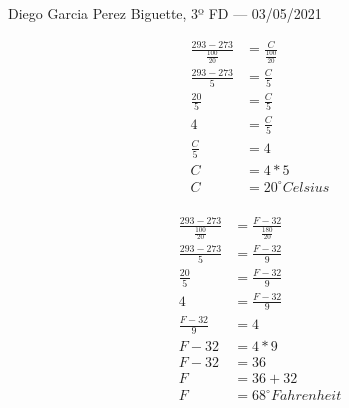 \documentclass{SchoolBook}
\begin{document}
\begin{day}{Diego Garcia Perez Biguette, 3º FD --- 03/05/2021}
\begin{enumerate}
            \begin{multicols}{2}
                \begin{align*}
                    \frac{293-273}{\frac{100}{20}} &= \frac{C}{\frac{100}{20}} \\
                                 \frac{293-273}{5} &= \frac{C}{5} \\
                                      \frac{20}{5} &= \frac{C}{5} \\
                                                 4 &= \frac{C}{5} \\
                                       \frac{C}{5} &= 4 \\
                                                 C &= 4 * 5 \\
                                                 C &= 20^\circ Celsius
                \end{align*} \\
                \begin{align*}
                    \frac{293-273}{\frac{100}{20}} &= \frac{F-32}{\frac{180}{20}} \\
                                 \frac{293-273}{5} &= \frac{F-32}{9} \\
                                      \frac{20}{5} &= \frac{F-32}{9} \\
                                                 4 &= \frac{F-32}{9} \\
                                    \frac{F-32}{9} &= 4 \\
                                              F-32 &= 4 * 9 \\
                                              F-32 &= 36 \\
                                                 F &= 36 + 32 \\
                                                 F &= 68^\circ Fahrenheit
                \end{align*}
            \end{multicols}
        \end{enumerate}
    \end{day}
    
\end{document}
